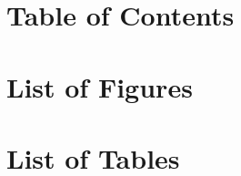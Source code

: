 

\begingroup
\let\cleardoublepage\relax
\let\clearpage\relax
\newpage
\chapter*{Table of Contents}
\tableofcontents

\newpage
\chapter{List of Figures}
\listoffigures

\newpage
\chapter{List of Tables}
\listoftables
\endgroup